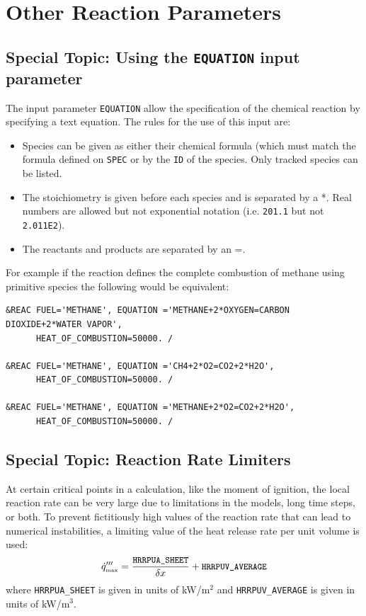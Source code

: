 \documentclass[11pt]{book}
\newcommand{\ct}{\tt\small}
\newcommand{\dx}{\delta x}
\newcommand{\dq}{\dot{q}}
\newcommand{\be}{\begin{equation}}
\newcommand{\ee}{\end{equation}}
\begin{document}
\newpage

\section{Other Reaction Parameters}


\subsection{Special Topic: Using the {\ct EQUATION} input parameter}
\label{info:EQUATION}

The input parameter {\ct EQUATION} allow the specification of the chemical reaction by specifying a text equation.  The rules for the use of this input are:

\begin{itemize}
\item Species can be given as either their chemical formula (which must match the formula defined on {\ct SPEC} or by the {\ct ID} of the species.  Only tracked species can be listed.
\item The stoichiometry is given before each species and is separated by a *.  Real numbers are allowed but not exponential notation (i.e. {\ct 201.1} but not {\ct 2.011E2}).
\item The reactants and products are separated by an =.
\end{itemize}

For example if the reaction defines the complete combustion of methane using primitive species the following would be equivalent:

\footnotesize
\begin{verbatim}
&REAC FUEL='METHANE', EQUATION ='METHANE+2*OXYGEN=CARBON DIOXIDE+2*WATER VAPOR',
      HEAT_OF_COMBUSTION=50000. /

&REAC FUEL='METHANE', EQUATION ='CH4+2*O2=CO2+2*H2O',
      HEAT_OF_COMBUSTION=50000. /

&REAC FUEL='METHANE', EQUATION ='METHANE+2*O2=CO2+2*H2O',
      HEAT_OF_COMBUSTION=50000. /
\end{verbatim} \normalsize


\subsection{Special Topic: Reaction Rate Limiters}
\label{info:REAC_Limiters}

At certain critical points in a calculation, like the moment of ignition, the local reaction rate can be very large due to limitations in the models, long time
steps, or both. To prevent fictitiously high values of the reaction rate that can lead to numerical instabilities, a limiting value of the heat release rate
per unit volume is used:
\be \dq'''_{\hbox{\tiny max}} = \frac{ \hbox{\ct HRRPUA\_SHEET} }{\dx} + \hbox{\ct HRRPUV\_AVERAGE} \ee
where {\ct HRRPUA\_SHEET} is given in units of kW/m$^2$ and {\ct HRRPUV\_AVERAGE} is given in units of kW/m$^3$.
\end{document}

